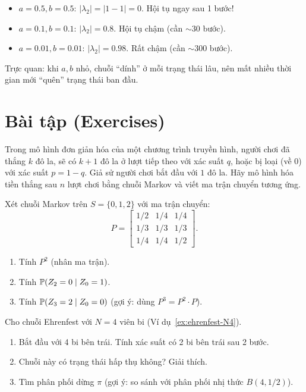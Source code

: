 \begin{example}
\begin{itemize}[nosep]
  \item $a = 0.5, b = 0.5$: $|\lambda_2| = |1-1| = 0$. Hội tụ ngay sau 1 bước!
  \item $a = 0.1, b = 0.1$: $|\lambda_2| = 0.8$. Hội tụ chậm (cần $\sim 30$ bước).
  \item $a = 0.01, b = 0.01$: $|\lambda_2| = 0.98$. Rất chậm (cần $\sim 300$ bước).
\end{itemize}
Trực quan: khi $a, b$ nhỏ, chuỗi ``dính'' ở mỗi trạng thái lâu, nên mất nhiều thời gian mới ``quên'' trạng thái ban đầu.
\end{example}

\section{Bài tập (Exercises)}
\label{sec:ch4-exercises}

\begin{exercise}
Trong mô hình đơn giản hóa của một chương trình truyền hình, người chơi đã thắng $k$ đô la,
sẽ có $k+1$ đô la ở lượt tiếp theo với xác suất $q$, hoặc bị loại (về $0$) với xác suất $p = 1-q$.
Giả sử người chơi bắt đầu với $1$ đô la. Hãy mô hình hóa tiền thắng sau $n$ lượt chơi
bằng chuỗi Markov và viết ma trận chuyển tương ứng.
\end{exercise}

\begin{exercise}
Xét chuỗi Markov trên $S = \{0, 1, 2\}$ với ma trận chuyển:
\[
  P = \begin{bmatrix}
    1/2 & 1/4 & 1/4 \\
    1/3 & 1/3 & 1/3 \\
    1/4 & 1/4 & 1/2
  \end{bmatrix}.
\]
\begin{enumerate}[label=(\alph*)]
  \item Tính $P^2$ (nhân ma trận).
  \item Tính $\mathbb{P}(Z_2 = 0 \mid Z_0 = 1)$.
  \item Tính $\mathbb{P}(Z_3 = 2 \mid Z_0 = 0)$ (gợi ý: dùng $P^3 = P^2 \cdot P$).
\end{enumerate}
\end{exercise}

\begin{exercise}
Cho chuỗi Ehrenfest với $N = 4$ viên bi (Ví dụ~\ref{ex:ehrenfest-N4}).
\begin{enumerate}[label=(\alph*)]
  \item Bắt đầu với 4 bi bên trái. Tính xác suất có 2 bi bên trái sau 2 bước.
  \item Chuỗi này có trạng thái hấp thụ không? Giải thích.
  \item Tìm phân phối dừng $\pi$ (gợi ý: so sánh với phân phối nhị thức $B(4, 1/2)$).
\end{enumerate}
\end{exercise}

